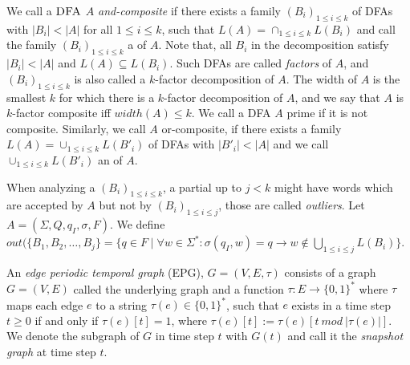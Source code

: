 We call a $\textsc{DFA}$ $A$ \textit{and-composite} if there exists a family $(B_i)_{1 \leq i \leq k}$ of DFAs with $|B_i| < |A|$ for all $1 \leq i \leq k$, such that $L(A) = \cap_{1\leq i \leq k} L(B_i)$ and call the family $(B_i)_{1\leq i \leq k}$ a \textit{\andDecomp} of $A$.
Note that, all $B_i$ in the decomposition satisfy $|B_i| < |A|$ and $L(A) \subseteq L(B_i)$.
Such DFAs are called \textit{factors} of $A$, and $(B_i)_{1\leq i \leq k}$ is also called a $k$-factor decomposition of $A$.
The width of $A$ is the smallest $k$ for which there is a $k$-factor decomposition of $A$, and we say that $A$ is $k$-factor composite iff $width(A) \leq k$.
We call a DFA $A$ prime if it is not composite.
Similarly, we call $A$ or-composite, if there exists a family $L(A) = \cup_{1\leq i \leq k} L(B'_i)$ of DFAs with $|B'_i| < |A|$ and we call $\cup_{1\leq i \leq k} L(B'_i)$ an \orDecomp of $A$.

When analyzing a \orDecomp $(B_i)_{1 \leq i \leq k}$, a partial \orDecomp up to $j < k$ might have words which are accepted by $A$ but not by $(B_i)_{1 \leq i \leq j}$, those are called \textit{outliers}.
Let $A = (\Sigma, Q, q_I, \sigma, F)$.
We define $out(\{B_1, B_2, \dots, B_j\} = \{q \in F \mid \forall w \in \Sigma^* \colon \sigma(q_I, w) = q \rightarrow w \notin \bigcup_{1\leq i \leq j} L(B_i)\}$.

An \textit{edge periodic temporal graph} (EPG), $G = (V, E, \tau)$ consists of a graph $G = (V, E)$ called the underlying graph and a function $\tau : E \rightarrow \{0, 1\}^*$ where $\tau$ maps each edge $e$ to a string $\tau(e) \in \{0, 1\}^*$, such that $e$ exists in a time step $t \geq 0$ if and only if $\tau(e)[t] = 1$, where $\tau(e)[t] := \tau(e)[t~ mod~ |\tau(e)|]$.
We denote the subgraph of $G$ in time step $t$ with $G(t)$ and call it the \textit{snapshot graph} at time step $t$.

